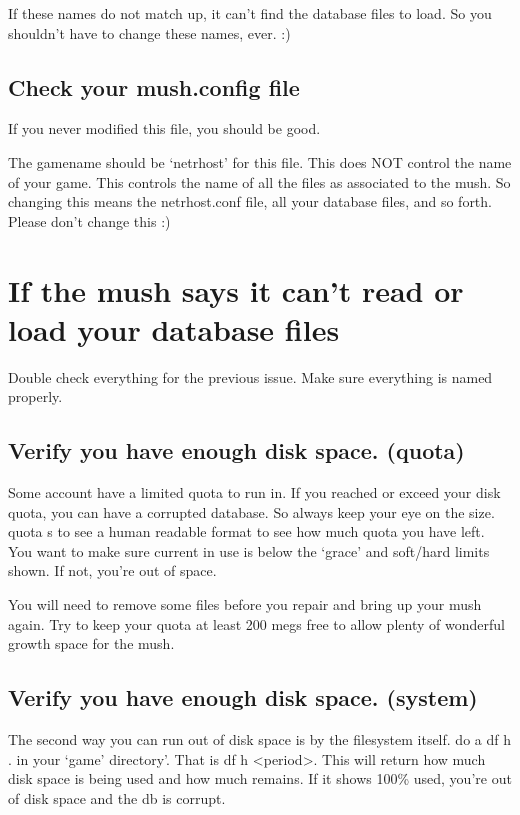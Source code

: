 \documentclass[letterpaper,10pt,english]{sphinxmanual}
\begin{document}
\sphinxAtStartPar
If these names do not match up, it can’t find the database files to load.
So you shouldn’t have to change these names, ever. :)


\subsection{Check your mush.config file}
\label{\detokenize{27-dbcorrupt:check-your-mush-config-file}}
\sphinxAtStartPar
If you never modified this file, you should be good.

\sphinxAtStartPar
The gamename should be ‘netrhost’ for this file.  This does NOT control
the name of your game.  This controls the name of all the files
as associated to the mush.  So changing this means the netrhost.conf
file, all your database files, and so forth.  Please don’t change this :)


\section{If the mush says it can’t read or load your database files}
\label{\detokenize{27-dbcorrupt:if-the-mush-says-it-can-t-read-or-load-your-database-files}}
\sphinxAtStartPar
Double check everything for the previous issue. Make sure everything is named properly.


\subsection{Verify you have enough disk space. (quota)}
\label{\detokenize{27-dbcorrupt:verify-you-have-enough-disk-space-quota}}
\sphinxAtStartPar
Some account have a limited quota to run in.  If you reached or exceed
your disk quota, you can have a corrupted database.  So always keep
your eye on the size.  quota \sphinxhyphen{}s to see a human readable format to see
how much quota you have left.  You want to make sure current in use is
below the ‘grace’ and soft/hard limits shown.  If not, you’re out of
space.

\sphinxAtStartPar
You will need to remove some files before you repair and bring up your
mush again.  Try to keep your quota at least 200 megs free to allow
plenty of wonderful growth space for the mush.


\subsection{Verify you have enough disk space.  (system)}
\label{\detokenize{27-dbcorrupt:verify-you-have-enough-disk-space-system}}
\sphinxAtStartPar
The second way you can run out of disk space is by the filesystem itself.
do a df \sphinxhyphen{}h . in your ‘game’ directory’.  That is df \sphinxhyphen{}h \textless{}period\textgreater{}.
This will return how much disk space is being used and how much remains.
If it shows 100\% used, you’re out of disk space and the db is corrupt.
\end{document}
